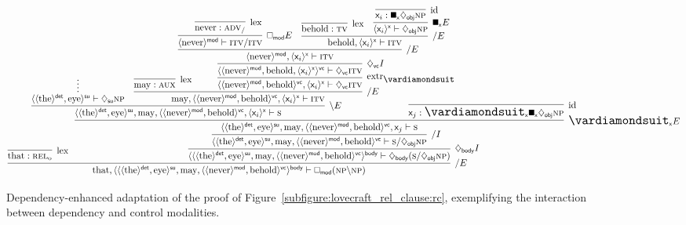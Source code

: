 \begin{figure}
	\smaller[2]
	\[
		\infer[\divright E]{\w{that}, \dbra{\dbra{\dbra{\w{the}}{det}, \w{eye}}{su}, \w{may}, \dbra{\dbra{\w{never}}{mod}, \w{behold}}{vc}}{body} \vdash \dbox{mod}(\np\divleft\np)}{
			\infer[\Lex]{\w{that} :  \subcat{l}{rel}{o}}{}
			&
			\hspace{-50pt}
			\infer[\ddia{body}I]{\dbra{\dbra{\dbra{\w{the}}{det}, \w{eye}}{su}, \w{may}, \dbra{\dbra{\w{never}}{mod}, \w{behold}}{vc}}{body} \vdash \ddia{body}(\s\divright\ddia{obj}\np)}{
				\infer[\divright I]{\dbra{\dbra{\w{the}}{det}, \w{eye}}{su}, \w{may}, \dbra{\dbra{\w{never}}{mod}, \w{behold}}{vc} \vdash \s\divright\ddia{obj}\np}{
					\infer[\dxdia{x}E]{\dbra{\dbra{\w{the}}{det}, \w{eye}}{su}, \w{may}, \dbra{\dbra{\w{never}}{mod}, \w{behold}}{vc}, \varj \vdash \s}{
						\infer[\divleft E]{\dbra{\dbra{\w{the}}{det}, \w{eye}}{su}, \w{may}, \dbra{\dbra{\w{never}}{mod}, \w{behold}}{vc}, \dbra{\vari}{x} \vdash \s}{
							\infer*{\dbra{\dbra{\w{the}}{det}, \w{eye}}{su} \vdash \ddia{su}\np}{	}
							&
							\infer[\divright E]{\w{may}, \dbra{\dbra{\w{never}}{mod}, \w{behold}}{vc}, \dbra{\vari}{x} \vdash \gtype{itv}}{
								\infer[\Lex]{\w{may} : \gtype{aux}}{}
								&
								\hspace{-25pt}\infer[\Extraction]{\dbra{\dbra{\w{never}}{mod}, \w{behold}}{vc}, \dbra{\vari}{x} \vdash \ddia{vc}\gtype{itv}}{
									\infer[\ddia{vc}I]{\dbra{\dbra{\w{never}}{mod}, \w{behold}, \dbra{\vari}{x}}{vc} \vdash \ddia{vc}\gtype{itv}}{
										\infer[\divright E]{\dbra{\w{never}}{mod}, \dbra{\vari}{x} \vdash \gtype{itv}}{
											\infer[\dbox{mod}E]{\dbra{\w{never}}{mod} \vdash \gtype{itv}\divright\gtype{itv}}{
												\infer[\Lex]{\w{never} : \gtype[l]{adv}_{\divright}}{}
											}
											&
											\infer[\divright E]{\w{behold}, \dbra{\vari}{x} \vdash \gtype{itv}}{
												\infer[\Lex]{\w{behold}: \gtype[l]{tv}}{}
												&
												\infer[\dxbox{x} E]{\dbra{\vari}{x} \vdash \ddia{obj} \np}{
													\infer[\Ax]{\vari : \dxbox{x}\ddia{obj}\np}{}
												}
											}
										}
									}
								}
							}
						}
						&
						\hspace{-60pt}
						\infer[\Ax]{\varj : \dxdia{x}\dxbox{x}\ddia{obj}\np}{}
					}
				}
			}
		}
	\]
	\caption{Dependency-enhanced adaptation of the proof of Figure~\ref{subfigure:lovecraft_rel_clause:rc}, exemplifying the interaction between dependency and control modalities.}
	\label{figure:lovecraft_dep_rep_clause}
\end{figure}


